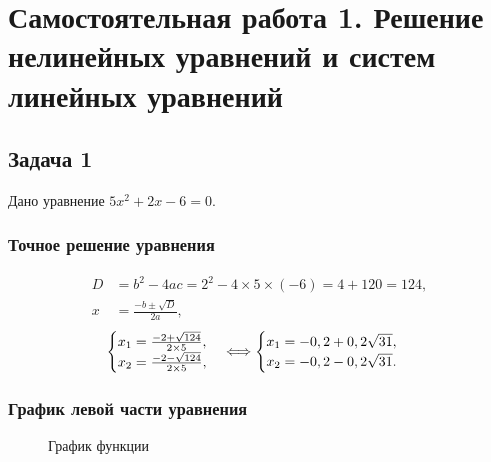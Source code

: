\documentclass[10pt, a4paper, titlepage]{article}
\begin{document}
\newpage
\section{Самостоятельная работа \textnumero{} 1. Решение нелинейных уравнений и систем линейных уравнений}

\subsection{Задача 1}

Дано уравнение $5x^2+2x-6=0$.

\subsubsection*{Точное решение уравнения}

\begin{align*}
D &= b^2-4ac=2^2-4\times5\times(-6)=4+120=124, \\
x &= \frac{-b\pm\sqrt{D}}{2a},
\end{align*}
\begin{equation*}
    \begin{cases}
        $$x_1=\frac{-2+\sqrt{124}}{2\times5}$$, \\
        $$x_2=\frac{-2-\sqrt{124}}{2\times5}$$,
    \end{cases}
    \Longleftrightarrow
    \begin{cases}
        $$x_1=-0,2+0,2\sqrt{31}$$, \\
        $$x_2=-0,2-0,2\sqrt{31}$$.
    \end{cases}
\end{equation*} 

\subsubsection*{График левой части уравнения}

\begin{figure}[!ht]
    \centering
    \caption{График функции}
    \label{sr1Task1Function}
\end{figure}
\end{document}
